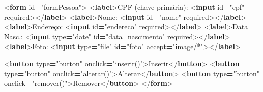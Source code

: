 \documentclass[
]{book}
\newenvironment{Shaded}{\begin{snugshade}}{\end{snugshade}}
\newcommand{\DataTypeTok}[1]{\textcolor[rgb]{0.13,0.29,0.53}{#1}}
\newcommand{\KeywordTok}[1]{\textcolor[rgb]{0.13,0.29,0.53}{\textbf{#1}}}
\newcommand{\NormalTok}[1]{#1}
\newcommand{\OperatorTok}[1]{\textcolor[rgb]{0.81,0.36,0.00}{\textbf{#1}}}
\newcommand{\OtherTok}[1]{\textcolor[rgb]{0.56,0.35,0.01}{#1}}
\newcommand{\StringTok}[1]{\textcolor[rgb]{0.31,0.60,0.02}{#1}}
\begin{document}
\begin{Shaded}
\begin{Highlighting}[]
\DataTypeTok{\textless{}}\KeywordTok{form}\OtherTok{ id}\OperatorTok{=}\StringTok{"formPessoa"}\DataTypeTok{\textgreater{}}
  \DataTypeTok{\textless{}}\KeywordTok{label}\DataTypeTok{\textgreater{}}\NormalTok{CPF (chave primária): }\DataTypeTok{\textless{}}\KeywordTok{input}\OtherTok{ id}\OperatorTok{=}\StringTok{"cpf"}\OtherTok{ required}\DataTypeTok{\textgreater{}\textless{}/}\KeywordTok{label}\DataTypeTok{\textgreater{}}
  \DataTypeTok{\textless{}}\KeywordTok{label}\DataTypeTok{\textgreater{}}\NormalTok{Nome: }\DataTypeTok{\textless{}}\KeywordTok{input}\OtherTok{ id}\OperatorTok{=}\StringTok{"nome"}\OtherTok{ required}\DataTypeTok{\textgreater{}\textless{}/}\KeywordTok{label}\DataTypeTok{\textgreater{}}
  \DataTypeTok{\textless{}}\KeywordTok{label}\DataTypeTok{\textgreater{}}\NormalTok{Endereço: }\DataTypeTok{\textless{}}\KeywordTok{input}\OtherTok{ id}\OperatorTok{=}\StringTok{"endereco"}\OtherTok{ required}\DataTypeTok{\textgreater{}\textless{}/}\KeywordTok{label}\DataTypeTok{\textgreater{}}
  \DataTypeTok{\textless{}}\KeywordTok{label}\DataTypeTok{\textgreater{}}\NormalTok{Data Nasc.: }\DataTypeTok{\textless{}}\KeywordTok{input}\OtherTok{ type}\OperatorTok{=}\StringTok{"date"}\OtherTok{ id}\OperatorTok{=}\StringTok{"data\_nascimento"}\OtherTok{ required}\DataTypeTok{\textgreater{}\textless{}/}\KeywordTok{label}\DataTypeTok{\textgreater{}}
  \DataTypeTok{\textless{}}\KeywordTok{label}\DataTypeTok{\textgreater{}}\NormalTok{Foto: }\DataTypeTok{\textless{}}\KeywordTok{input}\OtherTok{ type}\OperatorTok{=}\StringTok{"file"}\OtherTok{ id}\OperatorTok{=}\StringTok{"foto"}\OtherTok{ accept}\OperatorTok{=}\StringTok{"image/*"}\DataTypeTok{\textgreater{}\textless{}/}\KeywordTok{label}\DataTypeTok{\textgreater{}}

  \DataTypeTok{\textless{}}\KeywordTok{button}\OtherTok{ type}\OperatorTok{=}\StringTok{"button"}\OtherTok{ onclick}\OperatorTok{=}\StringTok{"inserir()"}\DataTypeTok{\textgreater{}}\NormalTok{Inserir}\DataTypeTok{\textless{}/}\KeywordTok{button}\DataTypeTok{\textgreater{}}
  \DataTypeTok{\textless{}}\KeywordTok{button}\OtherTok{ type}\OperatorTok{=}\StringTok{"button"}\OtherTok{ onclick}\OperatorTok{=}\StringTok{"alterar()"}\DataTypeTok{\textgreater{}}\NormalTok{Alterar}\DataTypeTok{\textless{}/}\KeywordTok{button}\DataTypeTok{\textgreater{}}
  \DataTypeTok{\textless{}}\KeywordTok{button}\OtherTok{ type}\OperatorTok{=}\StringTok{"button"}\OtherTok{ onclick}\OperatorTok{=}\StringTok{"remover()"}\DataTypeTok{\textgreater{}}\NormalTok{Remover}\DataTypeTok{\textless{}/}\KeywordTok{button}\DataTypeTok{\textgreater{}}
\DataTypeTok{\textless{}/}\KeywordTok{form}\DataTypeTok{\textgreater{}}


\end{Highlighting}
\end{Shaded}
\end{document}
